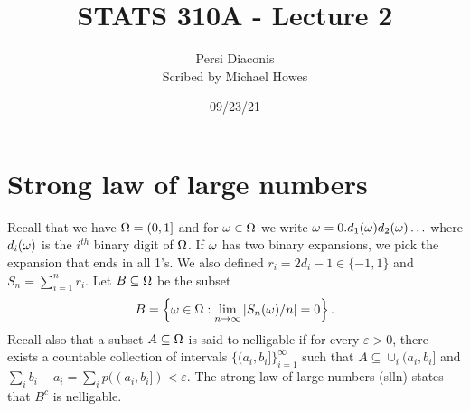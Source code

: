 




\title{STATS 310A - Lecture 2}
\author{Persi Diaconis\\ Scribed by Michael Howes}
\date{09/23/21}

\pagestyle{fancy}
\fancyhf{}


\maketitle
\section{Strong law of large numbers}
Recall that we have ${{\Omega}} = (0,1]$ and for ${\omega} \in {{\Omega}}$ we write ${\omega} = 0.d_1({\omega})d_2({\omega})\ldots$ where $d_i({\omega})$ is the $i^{th}$ binary digit of ${{\Omega}}$. If ${\omega}$ has two binary expansions, we pick the expansion that ends in all 1's. We also defined $r_i = 2d_i -1 \in \{-1,1\}$ and $S_n = \sum_{i=1}^n r_i$. Let $B \subseteq {{\Omega}}$ be the subset
\[B = \left\{{\omega} \in {{\Omega}} : \lim_{n \to \infty}{\left\lvert S_n({\omega})/n\right\rvert} = 0 \right\}.   \]
Recall also that a subset $A \subseteq {{\Omega}}$ is said to nelligable if for every $\varepsilon >0$, there exists a countable collection of intervals $\{(a_i,b_i]\}_{i=1}^\infty$ such that $A \subseteq \cup_i (a_i,b_i]$ and $\sum_i b_i-a_i = \sum_i p((a_i,b_i]) < \varepsilon$. The strong law of large numbers (slln) states that $B^c$ is nelligable.
